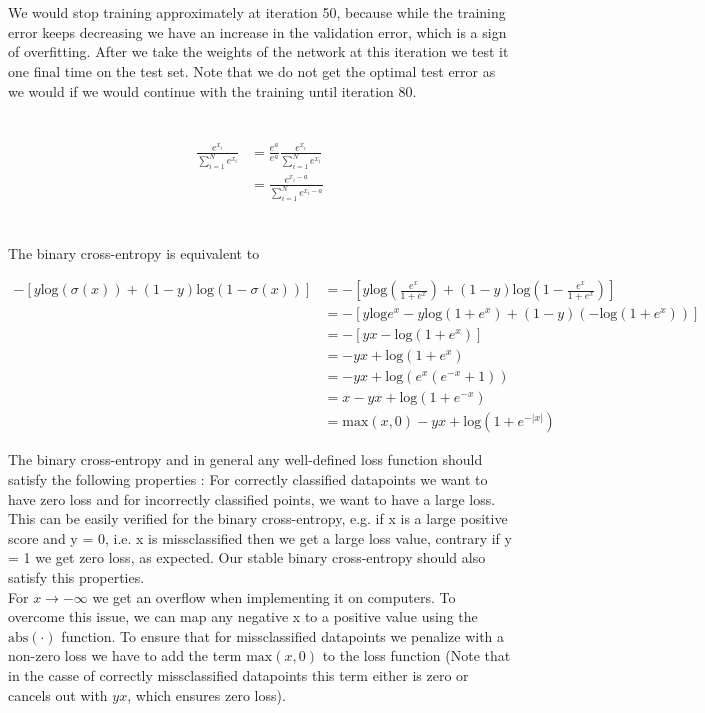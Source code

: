\documentclass[11pt]{article}
\newcommand{\exercise}{\section{}}
\newcommand{\sumf}[3]{\sum_{#1}^{#2} #3}
\begin{document}
\exercise

\exercise

We would stop training approximately at iteration 50, because while the training error keeps decreasing we have an increase in the validation error, which is a sign of overfitting. After we take the weights of the network at this iteration we test it one final time on the test set. Note that we do not get the optimal test error as we would if we would continue with the training until iteration 80.

\exercise

\exercise

\begin{align*}
\frac{e^{x_i}}{\sumf{i=1}{N}{e^{x_i}}} &= \frac{e^{a}}{e^{a}} \frac{e^{x_i}}{\sumf{i=1}{N}{e^{x_i}}} \\
&= \frac{e^{x_i - a}}{\sumf{i=1}{N}{e^{x_i - a}}}
\end{align*}

\exercise

The binary cross-entropy is equivalent to

\begin{align*}
-[y \text{log}(\sigma(x)) + (1 - y) \text{log}(1 - \sigma(x)) ] &= -[y \text{log}(\frac{e^x}{1 + e^x}) + (1 - y) \text{log}(1 - \frac{e^x}{1 + e^x}) ] \\
&= -[ y \text{log}e^x -y \text{log}(1 + e^x) + (1 - y)( -\text{log}(1 + e^x ))] \\
&= -[yx - \text{log}(1 + e^x )] \\
&= -yx + \text{log}(1 + e^x ) \\
&= -yx + \text{log}(e^x(e^{-x} + 1 )) \\
&= x -yx + \text{log}( 1 + e^{-x} ) \\
&= \text{max}(x,0) -yx + \text{log}( 1 + e^{-|x|} ) \tag{see below}
\end{align*}

\noindent The binary cross-entropy and in general any well-defined loss function should satisfy the following properties : For correctly classified datapoints we want to have zero loss and for incorrectly classified points, we want to have a large loss. This can be easily verified for the binary cross-entropy, e.g. if x is a large positive score and y = 0, i.e. x is missclassified then we get a large loss value, contrary if y = 1 we get zero loss, as expected. Our stable binary cross-entropy should also satisfy this properties.
\\
\noindent For $x \rightarrow -\infty$ we get an overflow  when implementing it on computers. To overcome this issue, we can map any negative x to a positive value using the $\text{abs}(\cdot)$ function. To ensure that for missclassified datapoints we penalize with a non-zero loss we have to add the term $\text{max}(x, 0)$ to the loss function (Note that in the casse of correctly missclassified datapoints this term either is zero or cancels out with $yx$, which ensures zero loss).
\end{document}
